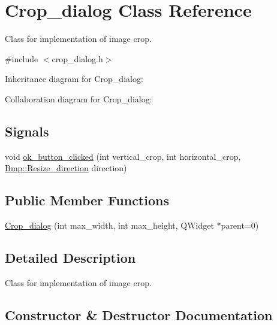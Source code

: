 \hypertarget{classCrop__dialog}{}\section{Crop\+\_\+dialog Class Reference}
\label{classCrop__dialog}


Class for implementation of image crop.  




{\ttfamily \#include $<$crop\+\_\+dialog.\+h$>$}



Inheritance diagram for Crop\+\_\+dialog\+:


Collaboration diagram for Crop\+\_\+dialog\+:
\subsection*{Signals}
\begin{DoxyCompactItemize}
\item 
void \hyperlink{classCrop__dialog_a89cb1bf27ead80a5419d59a27e287576}{ok\+\_\+button\+\_\+clicked} (int vertical\+\_\+crop, int horizontal\+\_\+crop, \hyperlink{namespaceBmp_a17aedbe2a7f4fccdb8542a417187eea7}{Bmp\+::\+Resize\+\_\+direction} direction)
\end{DoxyCompactItemize}
\subsection*{Public Member Functions}
\begin{DoxyCompactItemize}
\item 
\hyperlink{classCrop__dialog_ae3f26b66c76ab3881694bb6ead0b1d8f}{Crop\+\_\+dialog} (int max\+\_\+width, int max\+\_\+height, Q\+Widget $\ast$parent=0)
\end{DoxyCompactItemize}


\subsection{Detailed Description}
Class for implementation of image crop. 

\subsection{Constructor \& Destructor Documentation}
